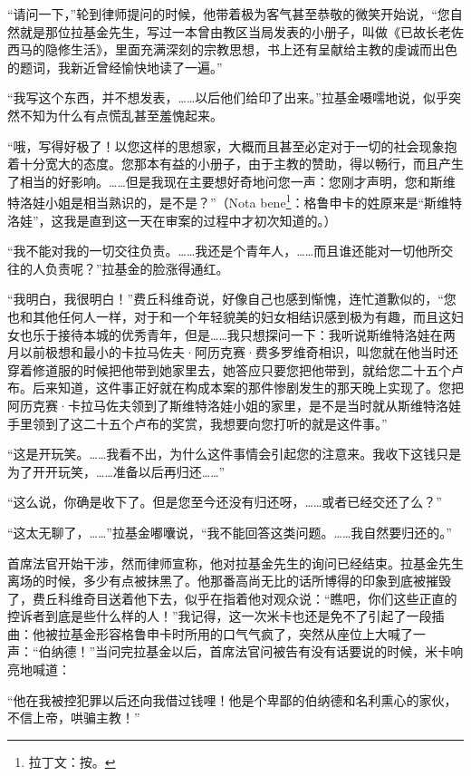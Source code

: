 \par “请问一下，”轮到律师提问的时候，他带着极为客气甚至恭敬的微笑开始说，“您自然就是那位拉基金先生，写过一本曾由教区当局发表的小册子，叫做《已故长老佐西马的隐修生活》，里面充满深刻的宗教思想，书上还有呈献给主教的虔诚而出色的题词，我新近曾经愉快地读了一遍。”
\par “我写这个东西，并不想发表，……以后他们给印了出来。”拉基金嗫嚅地说，似乎突然不知为什么有点慌乱甚至羞愧起来。
\par “哦，写得好极了！以您这样的思想家，大概而且甚至必定对于一切的社会现象抱着十分宽大的态度。您那本有益的小册子，由于主教的赞助，得以畅行，而且产生了相当的好影响。……但是我现在主要想好奇地问您一声：您刚才声明，您和斯维特洛娃小姐是相当熟识的，是不是？”（Nota bene\footnote{拉丁文：按。}：格鲁申卡的姓原来是“斯维特洛娃”，这我是直到这一天在审案的过程中才初次知道的。）
\par “我不能对我的一切交往负责。……我还是个青年人，……而且谁还能对一切他所交往的人负责呢？”拉基金的脸涨得通红。
\par “我明白，我很明白！”费丘科维奇说，好像自己也感到惭愧，连忙道歉似的，“您也和其他任何人一样，对于和一个年轻貌美的妇女相结识感到极为有趣，而且这妇女也乐于接待本城的优秀青年，但是……我只想探问一下：我听说斯维特洛娃在两月以前极想和最小的卡拉马佐夫·阿历克赛·费多罗维奇相识，叫您就在他当时还穿着修道服的时候把他带到她家里去，她答应只要您把他带到，就给您二十五个卢布。后来知道，这件事正好就在构成本案的那件惨剧发生的那天晚上实现了。您把阿历克赛·卡拉马佐夫领到了斯维特洛娃小姐的家里，是不是当时就从斯维特洛娃手里领到了这二十五个卢布的奖赏，我想要向您打听的就是这件事。”
\par “这是开玩笑。……我看不出，为什么这件事情会引起您的注意来。我收下这钱只是为了开开玩笑，……准备以后再归还……”
\par “这么说，你确是收下了。但是您至今还没有归还呀，……或者已经交还了么？”
\par “这太无聊了，……”拉基金嘟囔说，“我不能回答这类问题。……我自然要归还的。”
\par 首席法官开始干涉，然而律师宣称，他对拉基金先生的询问已经结束。拉基金先生离场的时候，多少有点被抹黑了。他那番高尚无比的话所博得的印象到底被摧毁了，费丘科维奇目送着他下去，似乎在指着他对观众说：“瞧吧，你们这些正直的控诉者到底是些什么样的人！”我记得，这一次米卡也还是免不了引起了一段插曲：他被拉基金形容格鲁申卡时所用的口气气疯了，突然从座位上大喊了一声：“伯纳德！”当问完拉基金以后，首席法官问被告有没有话要说的时候，米卡响亮地喊道：
\par “他在我被控犯罪以后还向我借过钱哩！他是个卑鄙的伯纳德和名利熏心的家伙，不信上帝，哄骗主教！”
